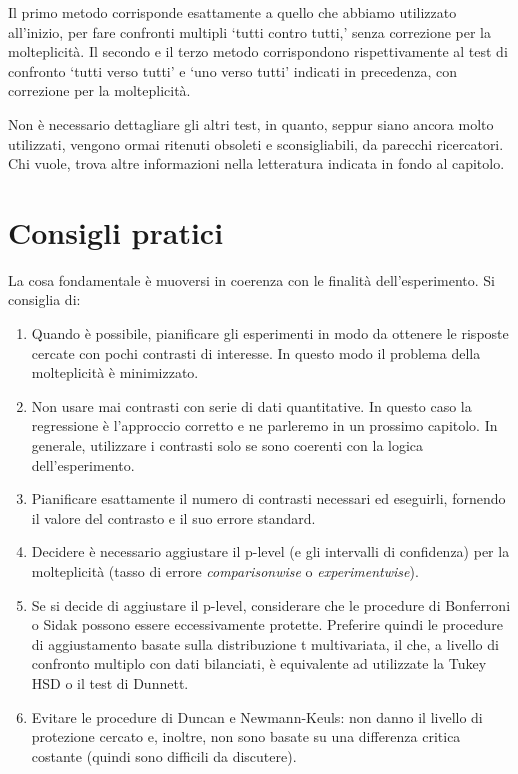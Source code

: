 \documentclass[a4paper,12pt,oneside]{book}
\providecommand{\tightlist}{%
  \setlength{\itemsep}{0pt}\setlength{\parskip}{0pt}}
\begin{document}
Il primo metodo corrisponde esattamente a quello che abbiamo utilizzato all'inizio, per fare confronti multipli `tutti contro tutti,' senza correzione per la molteplicità. Il secondo e il terzo metodo corrispondono rispettivamente al test di confronto `tutti verso tutti' e `uno verso tutti' indicati in precedenza, con correzione per la molteplicità.

Non è necessario dettagliare gli altri test, in quanto, seppur siano ancora molto utilizzati, vengono ormai ritenuti obsoleti e sconsigliabili, da parecchi ricercatori. Chi vuole, trova altre informazioni nella letteratura indicata in fondo al capitolo.

\hypertarget{consigli-pratici}{%
\section{Consigli pratici}\label{consigli-pratici}}

La cosa fondamentale è muoversi in coerenza con le finalità dell'esperimento. Si consiglia di:

\begin{enumerate}
\def\labelenumi{\arabic{enumi}.}
\tightlist
\item
  Quando è possibile, pianificare gli esperimenti in modo da ottenere le risposte cercate con pochi contrasti di interesse. In questo modo il problema della molteplicità è minimizzato.
\item
  Non usare mai contrasti con serie di dati quantitative. In questo caso la regressione è l'approccio corretto e ne parleremo in un prossimo capitolo. In generale, utilizzare i contrasti solo se sono coerenti con la logica dell'esperimento.
\item
  Pianificare esattamente il numero di contrasti necessari ed eseguirli, fornendo il valore del contrasto e il suo errore standard.
\item
  Decidere è necessario aggiustare il p-level (e gli intervalli di confidenza) per la molteplicità (tasso di errore \emph{comparisonwise} o \emph{experimentwise}).
\item
  Se si decide di aggiustare il p-level, considerare che le procedure di Bonferroni o Sidak possono essere eccessivamente protette. Preferire quindi le procedure di aggiustamento basate sulla distribuzione t multivariata, il che, a livello di confronto multiplo con dati bilanciati, è equivalente ad utilizzate la Tukey HSD o il test di Dunnett.
\item
  Evitare le procedure di Duncan e Newmann-Keuls: non danno il livello di protezione cercato e, inoltre, non sono basate su una differenza critica costante (quindi sono difficili da discutere).
\end{enumerate}
\end{document}
